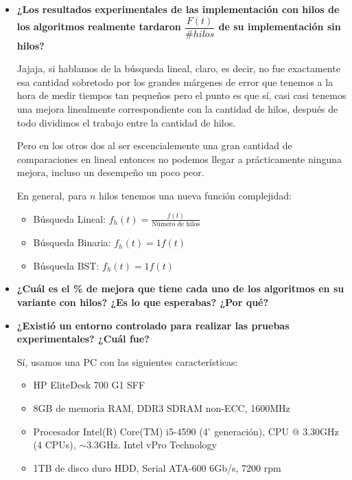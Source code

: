 \documentclass[12pt, fleqn]{article}                             %
\theoremstyle{break}                                            %
\begin{document}
\begin{itemize}
            \item
                \textbf{¿Los resultados experimentales de las implementación con hilos de los
                algoritmos realmente tardaron $\dfrac{F(t)}{\#hilos}$ de su implementación sin hilos?}

                Jajaja, si hablamos de la búsqueda lineal, claro, es decir, no fue exactamente esa cantidad
                sobretodo por los grandes márgenes de error que tenemos a la hora de medir tiempos
                tan pequeños pero el punto es que sí, casi casi tenemos una mejora linealmente correspondiente
                con la cantidad de hilos, después de todo dividimos el trabajo entre la cantidad de hilos.

                Pero en los otros dos al ser escencialemente una gran cantidad de comparaciones en lineal
                entonces no podemos llegar a prácticamente ninguna mejora, incluso un desempeño un poco peor.

                En general, para $n$ hilos tenemos una nueva función complejidad:
                \begin{itemize}
                    \item Búsqueda Lineal: $f_h(t) = \frac{f(t)}{\text{Número de hilos}}$
                    \item Búsqueda Binaria: $f_h(t) = 1 f(t)$
                    \item Búsqueda BST: $f_h(t) = 1 f(t)$
                \end{itemize}
                
            \item
                \textbf{¿Cuál es el \% de mejora que tiene cada uno de los algoritmos en su
                variante con hilos? ¿Es lo que esperabas? ¿Por qué?}

            \clearpage

            \item
                \textbf{¿Existió un entorno controlado para realizar las pruebas experimentales?
                ¿Cuál fue?}

                Sí, usamos una PC con las siguientes características:
                \begin{itemize}\setlength\itemsep{0em}
                    \item HP EliteDesk 700 G1 SFF
                    \item 8GB de memoria RAM, DDR3 SDRAM non-ECC, 1600MHz
                    \item Procesador Intel(R) Core(TM) i5-4590 (4$^\circ$ generación), CPU @ 3.30GHz 
                        (4 CPUs), $\sim$3.3GHz. Intel vPro Technology
                    \item 1TB de disco duro HDD, Serial ATA-600 6Gb/s, 7200 rpm
                \end{itemize}
                

\end{itemize}
\end{document}
